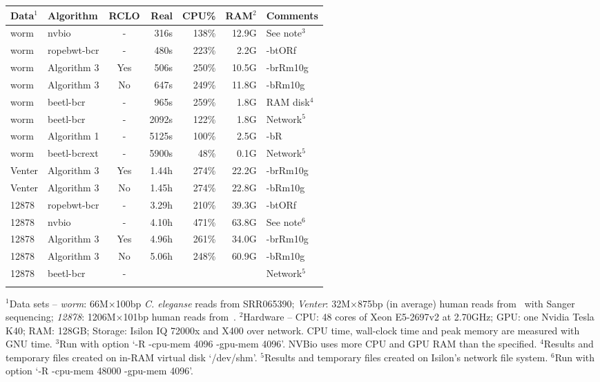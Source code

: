 \documentclass{bioinfo}
\begin{document}
\begin{table}[b]
{\footnotesize
\begin{tabular}{llcrrrl}
\toprule
Data$^1$& Algorithm&RCLO& Real  & CPU\% &RAM$^2$& Comments\\
\midrule
worm & nvbio       & -  & 316s  & 138\%&12.9G & See note$^3$\\
worm & ropebwt-bcr & -  & 480s  & 223\%&2.2G & -btORf\\
worm & Algorithm 3 & Yes& 506s  & 250\%&10.5G & -brRm10g \\
worm & Algorithm 3 & No & 647s  & 249\%&11.8G & -bRm10g \\
worm & beetl-bcr   & -  & 965s  & 259\%&1.8G & RAM disk$^4$\\
worm & beetl-bcr   & -  & 2092s & 122\%&1.8G & Network$^5$\\
worm & Algorithm 1 & -  & 5125s & 100\%&2.5G & -bR \\
worm & beetl-bcrext& -  & 5900s &  48\%&0.1G & Network$^5$\\
Venter&Algorithm 3 & Yes& 1.44h & 274\%&22.2G & -brRm10g \\
Venter&Algorithm 3 & No & 1.45h & 274\%&22.8G & -bRm10g \\
12878&ropebwt-bcr  & -  & 3.29h & 210\%&39.3G & -btORf \\
12878&nvbio        & -  &4.10h  & 471\%&63.8G & See note$^6$\\
12878&Algorithm 3  & Yes&4.96h  & 261\%&34.0G & -brRm10g \\
12878&Algorithm 3  & No &5.06h  & 248\%&60.9G & -bRm10g \\
12878&beetl-bcr    & -  &       &      &      & Network$^5$\\
\botrule
\end{tabular}}{$^1$Data sets -- {\it worm}: 66M$\times$100bp {\it C. eleganse} reads
from SRR065390; {\it Venter}: 32M$\times$875bp (in average) human reads
from~\citet{Levy:2007uq} with Sanger sequencing; {\it 12878}: 1206M$\times$101bp
human reads from~\citet{Depristo:2011vn}. $^2$Hardware -- CPU: 48 cores of
Xeon E5-2697v2 at 2.70GHz; GPU: one Nvidia Tesla K40; RAM: 128GB; Storage:
Isilon IQ 72000x and X400 over network. CPU time, wall-clock time and peak
memory are measured with GNU time. $^3$Run with option `-R -cpu-mem 4096 -gpu-mem
4096'. NVBio uses more CPU and GPU RAM than the specified. $^4$Results and
temporary files created on in-RAM virtual disk `/dev/shm'. $^5$Results and
temporary files created on Isilon's network file system. $^6$Run with
option `-R -cpu-mem 48000 -gpu-mem 4096'.}
\end{table}
\end{document}

